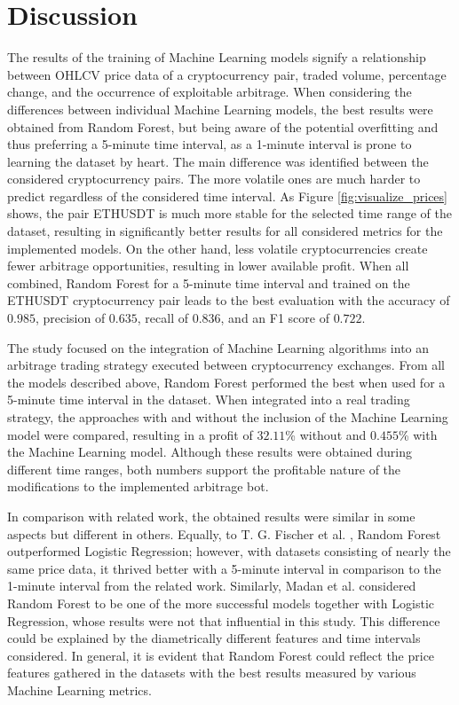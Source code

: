 \documentclass[conference,comsoc,10pt]{IEEEtran}
\begin{document}
\section{Discussion}
The results of the training of Machine Learning models signify a relationship between OHLCV price data of a cryptocurrency pair, traded volume, percentage change, and the occurrence of exploitable arbitrage. When considering the differences between individual Machine Learning models, the best results were obtained from Random Forest, but being aware of the potential overfitting and thus preferring a 5-minute time interval, as a 1-minute interval is prone to learning the dataset by heart. The main difference was identified between the considered cryptocurrency pairs. The more volatile ones are much harder to predict regardless of the considered time interval. As Figure \ref{fig:visualize_prices} shows, the pair ETHUSDT is much more stable for the selected time range of the dataset, resulting in significantly better results for all considered metrics for the implemented models. On the other hand, less volatile cryptocurrencies create fewer arbitrage opportunities, resulting in lower available profit. When all combined, Random Forest for a 5-minute time interval and trained on the ETHUSDT cryptocurrency pair leads to the best evaluation with the accuracy of $0.985$, precision of $0.635$, recall of $0.836$, and an F1 score of $0.722$.

The study focused on the integration of Machine Learning algorithms into an arbitrage trading strategy executed between cryptocurrency exchanges. From all the models described above, Random Forest performed the best when used for a 5-minute time interval in the dataset. When integrated into a real trading strategy, the approaches with and without the inclusion of the Machine Learning model were compared, resulting in a profit of $32.11$\% without and $0.455$\% with the Machine Learning model. Although these results were obtained during different time ranges, both numbers support the profitable nature of the modifications to the implemented arbitrage bot.

In comparison with related work, the obtained results were similar in some aspects but different in others. Equally, to T. G. Fischer et al. \cite{b5}, Random Forest outperformed Logistic Regression; however, with datasets consisting of nearly the same price data, it thrived better with a 5-minute interval in comparison to the 1-minute interval from the related work. Similarly, Madan et al. \cite{b23} considered Random Forest to be one of the more successful models together with Logistic Regression, whose results were not that influential in this study. This difference could be explained by the diametrically different features and time intervals considered. In general, it is evident that Random Forest could reflect the price features gathered in the datasets with the best results measured by various Machine Learning metrics.
\end{document}
